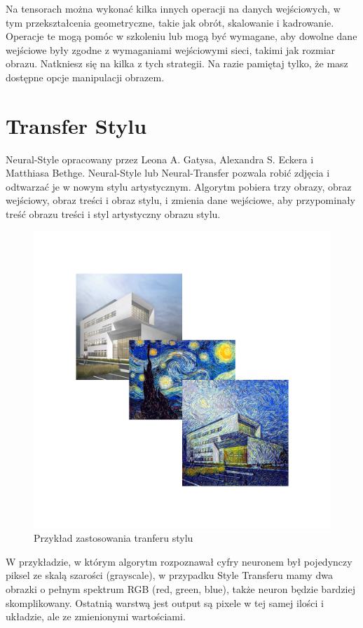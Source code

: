 \documentclass[brudnopis]{xmgr}
\begin{document}
Na tensorach można  wykonać kilka innych operacji na danych wejściowych, w tym przekształcenia geometryczne, takie jak obrót, skalowanie i kadrowanie. Operacje te mogą pomóc w szkoleniu lub mogą być wymagane, aby dowolne dane wejściowe były zgodne z wymaganiami wejściowymi sieci, takimi jak rozmiar obrazu. Natkniesz się na kilka z tych strategii. Na razie pamiętaj tylko, że masz dostępne opcje manipulacji obrazem.


\chapter{Transfer Stylu }

Neural-Style opracowany przez Leona A. Gatysa, Alexandra S. Eckera i Matthiasa Bethge. Neural-Style lub Neural-Transfer pozwala robić zdjęcia i odtwarzać je w nowym stylu artystycznym. Algorytm pobiera trzy obrazy, obraz wejściowy, obraz treści i obraz stylu, i zmienia dane wejściowe, aby przypominały treść obrazu treści i styl artystyczny obrazu stylu.

 \begin{figure}[!tbh]
\centering
\includegraphics[width=.8\hsize]{fig/6}
\caption{Przykład zastosowania tranferu stylu\label{RYS.6}}
\end{figure}

W przykładzie, w którym algorytm rozpoznawał cyfry neuronem był pojedynczy piksel ze skalą szarości (grayscale), w przypadku Style Transferu mamy dwa obrazki o pełnym  spektrum RGB (red, green, blue), także neuron będzie bardziej skomplikowany. Ostatnią warstwą jest output są pixele w tej samej ilości i układzie, ale ze zmienionymi wartościami.
\end{document}
